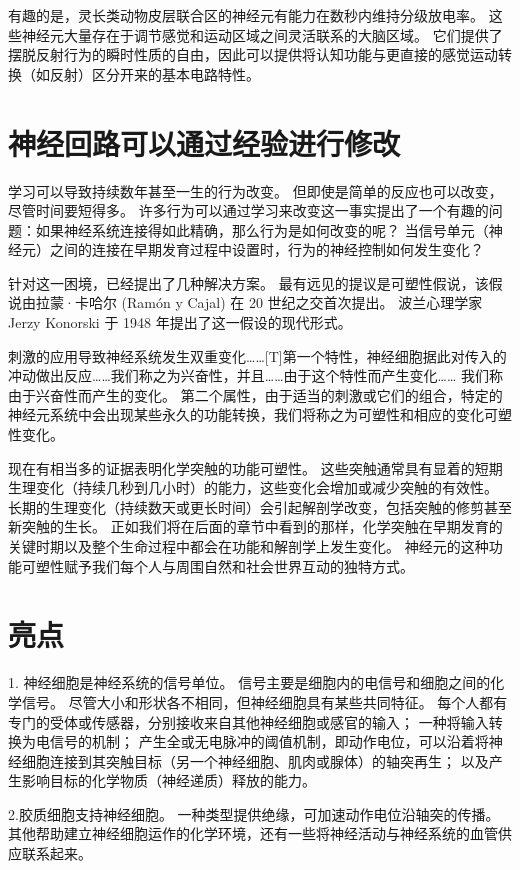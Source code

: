 有趣的是，灵长类动物皮层联合区的神经元有能力在数秒内维持分级放电率。 
这些神经元大量存在于调节感觉和运动区域之间灵活联系的大脑区域。 
它们提供了摆脱反射行为的瞬时性质的自由，因此可以提供将认知功能与更直接的感觉运动转换（如反射）区分开来的基本电路特性。


\section{神经回路可以通过经验进行修改}
学习可以导致持续数年甚至一生的行为改变。 
但即使是简单的反应也可以改变，尽管时间要短得多。 
许多行为可以通过学习来改变这一事实提出了一个有趣的问题：如果神经系统连接得如此精确，那么行为是如何改变的呢？ 
当信号单元（神经元）之间的连接在早期发育过程中设置时，行为的神经控制如何发生变化？


针对这一困境，已经提出了几种解决方案。 
最有远见的提议是可塑性假说，该假说由拉蒙·卡哈尔 (Ramón y Cajal) 在 20 世纪之交首次提出。 
波兰心理学家 Jerzy Konorski 于 1948 年提出了这一假设的现代形式。


刺激的应用导致神经系统发生双重变化……[T]第一个特性，神经细胞据此对传入的冲动做出反应……我们称之为兴奋性，并且……由于这个特性而产生变化…… 我们称由于兴奋性而产生的变化。 
第二个属性，由于适当的刺激或它们的组合，特定的神经元系统中会出现某些永久的功能转换，我们将称之为可塑性和相应的变化可塑性变化。


现在有相当多的证据表明化学突触的功能可塑性。 
这些突触通常具有显着的短期生理变化（持续几秒到几小时）的能力，这些变化会增加或减少突触的有效性。 
长期的生理变化（持续数天或更长时间）会引起解剖学改变，包括突触的修剪甚至新突触的生长。 
正如我们将在后面的章节中看到的那样，化学突触在早期发育的关键时期以及整个生命过程中都会在功能和解剖学上发生变化。 
神经元的这种功能可塑性赋予我们每个人与周围自然和社会世界互动的独特方式。



\section{亮点}
1. 神经细胞是神经系统的信号单位。 信号主要是细胞内的电信号和细胞之间的化学信号。 
尽管大小和形状各不相同，但神经细胞具有某些共同特征。 
每个人都有专门的受体或传感器，分别接收来自其他神经细胞或感官的输入； 
一种将输入转换为电信号的机制； 产生全或无电脉冲的阈值机制，即动作电位，可以沿着将神经细胞连接到其突触目标（另一个神经细胞、肌肉或腺体）的轴突再生； 以及产生影响目标的化学物质（神经递质）释放的能力。


2.胶质细胞支持神经细胞。 
一种类型提供绝缘，可加速动作电位沿轴突的传播。 
其他帮助建立神经细胞运作的化学环境，还有一些将神经活动与神经系统的血管供应联系起来。


